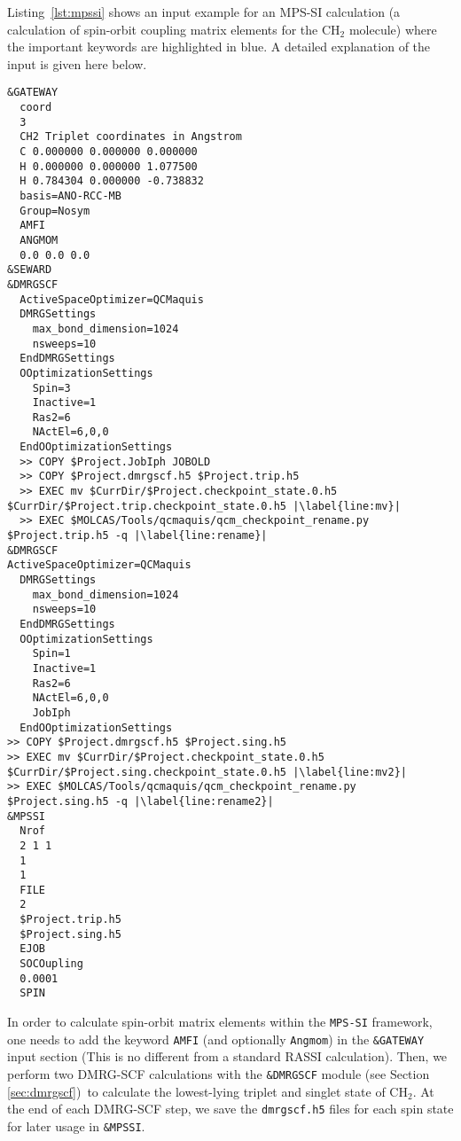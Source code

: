 \documentclass[bibliography=totoc,12pt,a4paper]{scrartcl}
\newcommand{\kwd}[1]{\texttt{#1}}
\begin{document}
Listing~\ref{lst:mpssi} shows an input example for an MPS-SI calculation (a calculation of spin-orbit coupling matrix elements for the CH$_2$ molecule) where the important keywords are highlighted in blue. 
A detailed explanation of the input is given here below.

\begin{lstlisting}[language=molcas,caption={(File \texttt{007.input} in the QCMaquis test directory) Input example for a one-shot MPS-SI spin-orbit calculation (Singlet and triplet state, CH$_2$ molecule, 6 electrons in 6 orbitals, C1 symmetry).},label=lst:mpssi]
&GATEWAY
  coord
  3
  CH2 Triplet coordinates in Angstrom
  C 0.000000 0.000000 0.000000
  H 0.000000 0.000000 1.077500
  H 0.784304 0.000000 -0.738832
  basis=ANO-RCC-MB
  Group=Nosym
  AMFI
  ANGMOM
  0.0 0.0 0.0
&SEWARD
&DMRGSCF
  ActiveSpaceOptimizer=QCMaquis
  DMRGSettings
    max_bond_dimension=1024
    nsweeps=10
  EndDMRGSettings
  OOptimizationSettings
    Spin=3
    Inactive=1
    Ras2=6
    NActEl=6,0,0
  EndOOptimizationSettings
  >> COPY $Project.JobIph JOBOLD
  >> COPY $Project.dmrgscf.h5 $Project.trip.h5
  >> EXEC mv $CurrDir/$Project.checkpoint_state.0.h5 $CurrDir/$Project.trip.checkpoint_state.0.h5 |\label{line:mv}|
  >> EXEC $MOLCAS/Tools/qcmaquis/qcm_checkpoint_rename.py $Project.trip.h5 -q |\label{line:rename}|
&DMRGSCF
ActiveSpaceOptimizer=QCMaquis
  DMRGSettings
    max_bond_dimension=1024
    nsweeps=10
  EndDMRGSettings
  OOptimizationSettings
    Spin=1
    Inactive=1
    Ras2=6
    NActEl=6,0,0
    JobIph
  EndOOptimizationSettings
>> COPY $Project.dmrgscf.h5 $Project.sing.h5
>> EXEC mv $CurrDir/$Project.checkpoint_state.0.h5 $CurrDir/$Project.sing.checkpoint_state.0.h5 |\label{line:mv2}|
>> EXEC $MOLCAS/Tools/qcmaquis/qcm_checkpoint_rename.py $Project.sing.h5 -q |\label{line:rename2}|
&MPSSI
  Nrof
  2 1 1
  1
  1
  FILE
  2
  $Project.trip.h5
  $Project.sing.h5
  EJOB
  SOCOupling
  0.0001
  SPIN
\end{lstlisting}

In order to calculate spin-orbit matrix elements within the \kwd{MPS-SI} framework, one needs to add the keyword \texttt{AMFI} (and optionally \texttt{Angmom}) in the \kwd{\&GATEWAY} input section (This is no different from a standard RASSI calculation). Then, we perform two DMRG-SCF calculations with the \kwd{\&DMRGSCF} module (see Section \ref{sec:dmrgscf})\ to calculate the lowest-lying triplet and singlet state of CH$_2$.
At the end of each DMRG-SCF step, we save the \texttt{dmrgscf.h5} files for each spin state for later usage in \kwd{\&MPSSI}.
\end{document}
